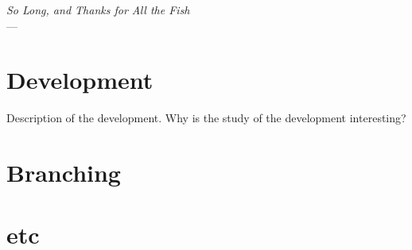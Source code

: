 \label{ch:lung}
\begin{flushright}{\slshape    
		So Long, and Thanks for All the Fish} \\ \medskip
    ---  \citep{Adams1984}
\end{flushright}
\lipsum[1]

\section{Development}
Description of the development. Why is the study of the development interesting?

\section{Branching}

\section{etc}